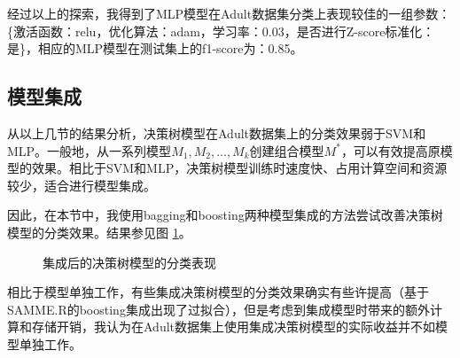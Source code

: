 \documentclass[12pt,a4paper]{article}
\theoremstyle{definition}
\begin{document}
经过以上的探索，我得到了MLP模型在Adult数据集分类上表现较佳的一组参数：\{激活函数：relu，优化算法：adam，学习率：0.03，是否进行Z-score标准化：是\}，相应的MLP模型在测试集上的f1-score为：0.85。

\subsection{模型集成}

从以上几节的结果分析，决策树模型在Adult数据集上的分类效果弱于SVM和MLP。一般地，从一系列模型$M_1, M_2, ... , M_k$创建组合模型$M^*$，可以有效提高原模型的效果。相比于SVM和MLP，决策树模型训练时速度快、占用计算空间和资源较少，适合进行模型集成。

\vspace{0.01\linewidth}
因此，在本节中，我使用bagging和boosting两种模型集成的方法尝试改善决策树模型的分类效果。结果参见图 \ref{fig:model-plus}。

\begin{figure}[H]
	\centering
	\caption{集成后的决策树模型的分类表现}
	\label{fig:model-plus}
\end{figure}

相比于模型单独工作，有些集成决策树模型的分类效果确实有些许提高（基于SAMME.R的boosting集成出现了过拟合），但是考虑到集成模型时带来的额外计算和存储开销，我认为在Adult数据集上使用集成决策树模型的实际收益并不如模型单独工作。
\end{document}
